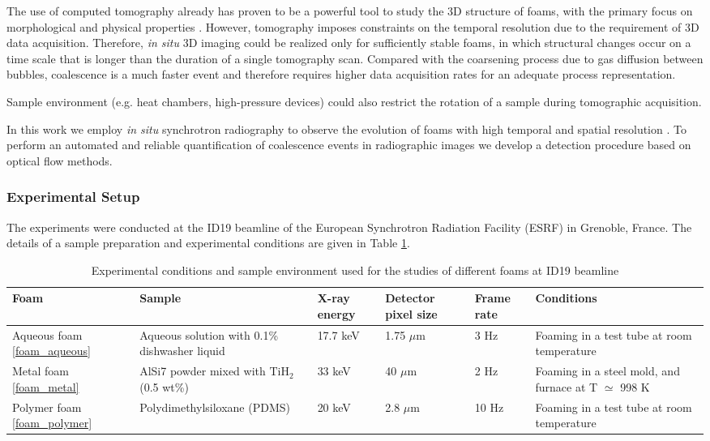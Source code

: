 The use of computed tomography already has proven to be a powerful tool to study the 3D structure of foams, with the primary focus on morphological and physical properties \cite{Helfen05, Rack09} . However, tomography imposes constraints on the temporal resolution due to the requirement of 3D data acquisition.  Therefore, \textit{in situ} 3D imaging could be realized only for sufficiently stable foams, in which structural changes occur on a time scale that is longer than the duration of a single tomography scan. 
Compared with the coarsening process due to gas diffusion
between bubbles, coalescence is a much faster event and
therefore requires higher data acquisition rates for an adequate process representation.

Sample environment (e.g. heat chambers, high-pressure devices) could also restrict the rotation of a sample during tomographic acquisition.

In this work we employ \textit{in situ} synchrotron radiography to observe the evolution of foams with high temporal and spatial resolution \cite{GarciaMoreno08, Rack10}. To perform an
automated and reliable quantification of coalescence
events in radiographic images we develop a detection procedure based on optical flow methods.




\subsubsection{Experimental Setup}


The experiments were conducted at the ID19 beamline \cite{Weitkamp10} of the European Synchrotron Radiation
Facility (ESRF) in Grenoble, France. The details of a sample preparation and experimental conditions are given in Table \ref{tab:foams_exp}.

\begin{table}[ht] \footnotesize
\centering
\caption{Experimental conditions and sample environment used for the studies of different foams at ID19 beamline \cite{Weitkamp10}}
\begin{tabular}{p{1.7cm}p{3.5cm}p{1.5cm}p{1.4cm}p{1.2cm}p{3.5cm}}
\toprule
Foam & Sample & X-ray energy & Detector pixel size & Frame rate & Conditions   \\ 
\midrule
Aqueous foam \ref{foam_aqueous}  & Aqueous solution with 0.1\%
dishwasher liquid & 17.7 keV & 1.75 $\mu$m & 3 Hz & Foaming in a test tube at
room temperature  \\ 
\midrule

Metal foam \ref{foam_metal}  & AlSi7 powder mixed with
$\text{TiH}_{2}$ (0.5 wt\%) & 33 keV & 40 $\mu$m & 2 Hz & Foaming in a steel mold,
and furnace at T $\simeq$ 998 K  \\ 
\midrule

Polymer foam \ref{foam_polymer}  & Polydimethylsiloxane (PDMS) & 20 keV & 2.8 $\mu$m & 10 Hz & Foaming in a test tube at room temperature  \\ 

\bottomrule
\end{tabular}
\label{tab:foams_exp}%
\end{table}



